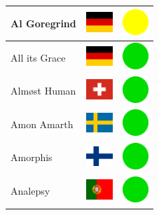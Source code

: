 \documentclass[12pt, a4paper, twoside]{report}
\begin{document}
\begin{center}
\begin{longtable}{|p{5cm}|p{2cm}|p{2cm}|}
			Al Goregrind & \includegraphics[width=1cm]{4x3/de} & \includegraphics[width=1cm]{likes/m} \\ \hline
			All its Grace & \includegraphics[width=1cm]{4x3/de} & \includegraphics[width=1cm]{likes/y} \\ \hline
			Almøst Human & \includegraphics[width=1cm]{4x3/ch} & \includegraphics[width=1cm]{likes/y} \\ \hline
			Amon Amarth & \includegraphics[width=1cm]{4x3/se} & \includegraphics[width=1cm]{likes/y} \\ \hline
			Amorphis & \includegraphics[width=1cm]{4x3/fi} & \includegraphics[width=1cm]{likes/y} \\ \hline
			Analepsy & \includegraphics[width=1cm]{4x3/pt} & \includegraphics[width=1cm]{likes/y} \\ \hline

\end{longtable}
\end{center}
\end{document}
